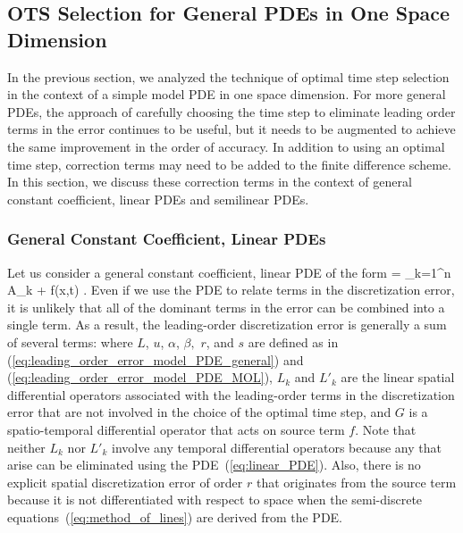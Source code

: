 \documentclass[oneeqnum,onefignum,onetabnum,onethmnum]{siamltex}
\begin{document}
\subsection{\label{sec:ots_general_1d_pdes} 
            OTS Selection for General PDEs in One Space Dimension} 
In the previous section, we analyzed the technique of optimal time step 
selection in the context of a simple model PDE in one space dimension.  
For more general PDEs, the approach of carefully choosing the time step to 
eliminate leading order terms in the error continues to be useful, but it 
needs to be augmented to achieve the same improvement in the order of accuracy.
In addition to using an optimal time step, correction terms may need to be 
added to the finite difference scheme.  In this section, we discuss these 
correction terms in the context of general constant coefficient, linear PDEs 
and semilinear PDEs. 


\subsubsection*{\label{sec:ots_linear_pde} 
            General Constant Coefficient, Linear PDEs} 
Let us consider a general constant coefficient, linear PDE of the form
\beq
   = 
  \sum_{k=1}^n A_k  + f(x,t)
  \label{eq:linear_PDE}.
\eeq
Even if we use the PDE to relate terms in the discretization error, it is
unlikely that all of the dominant terms in the error can be combined into 
a single term.   As a result, the leading-order discretization error is
generally a sum of several terms:
\bea
  \dt{}
  \label{eq:leading_order_error_linear_PDE_MOL}
\eea
where $L$, $u$, $\alpha$, $\beta,$ $r$, and $s$ are defined as in
(\ref{eq:leading_order_error_model_PDE_general}) and
(\ref{eq:leading_order_error_model_PDE_MOL}), 
$L_k$ and $L'_k$ are the linear spatial differential operators associated 
with the leading-order terms in the discretization error that are not involved 
in the choice of the optimal time step, and $G$ is a spatio-temporal 
differential operator that acts on source term $f$.  
Note that neither $L_k$ nor $L'_k$ involve any temporal differential 
operators because any that arise can be eliminated using the 
PDE~(\ref{eq:linear_PDE}).  Also, there is no explicit spatial discretization 
error of order $r$ that originates from the source term because it is not 
differentiated with respect to space when the semi-discrete 
equations~(\ref{eq:method_of_lines}) are derived from the PDE.
\end{document}
